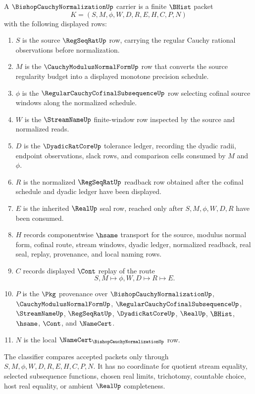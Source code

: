 \begin{definition}
\label{def:bishop-cauchy-normalization-carrier}
A $\BishopCauchyNormalizationUp$ carrier is a finite $\BHist$ packet
$$
K=(S,M,\phi,W,D,R,E,H,C,P,N)
$$
with the following displayed rows:
\begin{enumerate}
\item $S$ is the source $\RegSeqRatUp$ row, carrying the regular Cauchy rational observations before normalization.
\item $M$ is the $\CauchyModulusNormalFormUp$ row that converts the source regularity budget into a displayed monotone precision schedule.
\item $\phi$ is the $\RegularCauchyCofinalSubsequenceUp$ row selecting cofinal source windows along the normalized schedule.
\item $W$ is the $\StreamNameUp$ finite-window row inspected by the source and normalized reads.
\item $D$ is the $\DyadicRatCoreUp$ tolerance ledger, recording the dyadic radii, endpoint observations, slack rows, and comparison cells consumed by $M$ and $\phi$.
\item $R$ is the normalized $\RegSeqRatUp$ readback row obtained after the cofinal schedule and dyadic ledger have been displayed.
\item $E$ is the inherited $\RealUp$ seal row, reached only after $S,M,\phi,W,D,R$ have been consumed.
\item $H$ records componentwise $\hsame$ transport for the source, modulus normal form, cofinal route, stream windows, dyadic ledger, normalized readback, real seal, replay, provenance, and local naming rows.
\item $C$ records displayed $\Cont$ replay of the route
$$
S,M \longmapsto \phi,W,D \longmapsto R \longmapsto E .
$$
\item $P$ is the $\Pkg$ provenance over $\BishopCauchyNormalizationUp$, $\CauchyModulusNormalFormUp$, $\RegularCauchyCofinalSubsequenceUp$, $\StreamNameUp$, $\RegSeqRatUp$, $\DyadicRatCoreUp$, $\RealUp$, $\BHist$, $\hsame$, $\Cont$, and $\NameCert$.
\item $N$ is the local $\NameCert_{\BishopCauchyNormalizationUp}$ row.
\end{enumerate}
The classifier compares accepted packets only through $S,M,\phi,W,D,R,E,H,C,P,N$. It has no coordinate for quotient stream equality, selected subsequence functions, chosen real limits, trichotomy, countable choice, host real equality, or ambient $\RealUp$ completeness.
\end{definition}

